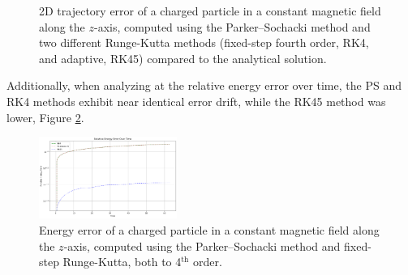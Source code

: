 \documentclass{article}
\begin{document}
\begin{figure}[H]
\begin{minipage}[t]{.48\textwidth}
                \caption{2D trajectory error of a charged particle in a constant magnetic field along the $z$-axis, computed using the Parker–Sochacki method and two different Runge-Kutta methods (fixed-step fourth order, RK4, and adaptive, RK45) compared to the analytical solution.}
                \label{fig: usecase1-1, trajectory error}
            \end{minipage}
        \end{figure}
Additionally, when analyzing at the relative energy error over time, the PS and RK4 methods exhibit near identical error drift, while the RK45 method was lower, Figure \ref{FIG: ConstantB_energyerror_1cycle}.
         \begin{figure}[H]
            \centering
            \captionsetup{width=0.48\textwidth}
            \includegraphics[width=0.4\textwidth]{Images/ConstantB/PS_Order4_energy_comparison_UseCase1-1.png}
            \caption{Energy error of a charged particle in a constant magnetic field along the $z$-axis, computed using the Parker–Sochacki method and fixed-step Runge-Kutta, both to 4$^{\text{th}}$ order.}
            \label{FIG: ConstantB_energyerror_1cycle}
        \end{figure}
           
\end{document}
